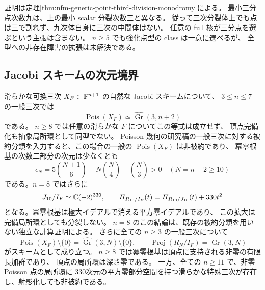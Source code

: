 証明は定理\ref{thm:nfm-generic-point-third-division-monodromy}による。
最小三分点次数九は、上の最小 scalar 分裂次数三と異なる。
従って三次分裂体上でも点は三で割れず、九次体自身に三次の中間体はない。
任意の full 核が三分点を選ぶという主張は含まない。
$n\ge5$ でも強化点型の class は一意に選べるが、
全型への非存在障害の拡張は未解決である。

\subsection{Jacobi スキームの次元境界}
\begin{maintheorem}
滑らかな可換三次 $X_F\subset\mathbb P^{n+1}$ の自然な Jacobi スキームについて、
$3\le n\le7$ の一般三次では
\[
 \operatorname{Pois}(X_F)\simeq\widehat{\operatorname{Gr}}(3,n+2)
\]
である。
$n\ge8$ では任意の滑らかな $F$ についてこの等式は成立せず、
頂点完備化も抽象局所環として同型でない。
Poisson 幾何の研究稿\cite{NCCubicA}の一般三次に対する被約分類を入力すると、この場合の一般の
$\operatorname{Pois}(X_F)$ は非被約であり、
冪零根基の次数二部分の次元は少なくとも
\[
 \epsilon_N=5\binom{N+1}{6}-N\binom N4+\binom N3>0\quad(N=n+2\ge10)
\]
である。$n=8$ ではさらに
\[
 J_{10}/I_F\simeq\mathbb C(-2)^{330},\qquad
 H_{R_{10}/I_F}(t)=H_{R_{10}/J_{10}}(t)+330t^2
\]
となる。冪零根基は極大イデアルで消える平方零イデアルであり、
この拡大は完備局所環としても分裂しない。
$n=8$ のこの結論は、既存の被約分類を用いない独立な計算証明による。
さらに全ての $n\ge3$ の一般三次について
\[
 \operatorname{Pois}(X_F)\setminus\{0\}
 =\widehat{\operatorname{Gr}}(3,N)\setminus\{0\},\qquad
 \operatorname{Proj}(R_N/I_F)=\operatorname{Gr}(3,N)
\]
がスキームとして成り立つ。
$n\ge8$ では冪零根基は頂点に支持される非零の有限長加群であり、
頂点の局所環は深さ零である。
一方、全ての $n\ge11$ で、非零 Poisson 点の局所環に
330次元の平方零部分空間を持つ滑らかな特殊三次が存在し、射影化しても非被約である。
\end{maintheorem}

